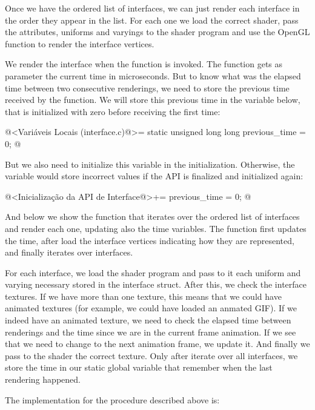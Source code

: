 Once we have the ordered list of interfaces, we can just render each
interface in the order they appear in the list. For each one we load
the correct shader, pass the attributes, uniforms and varyings to the
shader program and use the OpenGL function to render the interface
vertices.

We render the interface when the
function  is invoked. The function
gets as parameter the current time in microseconds. But to know what
was the elapsed time between two consecutive renderings, we need to
store the previous time received by the function. We will store this
previous time in the variable below, that is initialized with zero
before receiving the first time:

\iniciocodigo
@<Variáveis Locais (interface.c)@>=
static unsigned long long previous_time = 0;
@
\fimcodigo

But we also need to initialize this variable in the
initialization. Otherwise, the variable would store incorrect values
if the API is finalized and initialized again:

\iniciocodigo
@<Inicialização da API de Interface@>+=
previous_time = 0;
@
\fimcodigo

And below we show the function that iterates over the ordered list of
interfaces and render each one, updating also the time variables. The
function first updates the time, after load the interface vertices
indicating how they are represented, and finally iterates over
interfaces.

For each interface, we load the shader program and pass to it each
uniform and varying necessary stored in the interface struct. After
this, we check the interface textures. If we have more than one
texture, this means that we could have animated textures (for example,
we could have loaded an anmated GIF). If we indeed have an animated
texture, we need to check the elapsed time between renderings and the
time since we are in the current frame animation. If we see that we
need to change to the next animation frame, we update it. And finally
we pass to the shader the correct texture. Only after iterate over all
interfaces, we store the time in our static global variable that
remember when the last rendering happened.

The implementation for the procedure described above is:

